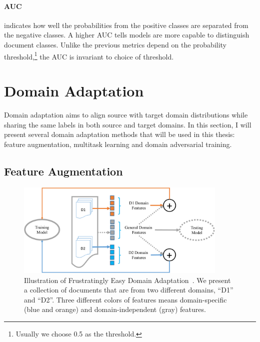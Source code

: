 \paragraph{AUC} indicates how well the probabilities from the positive classes are separated from the negative classes. 
A higher AUC tells models are more capable to distinguish document classes.
Unlike the previous metrics depend on the probability threshold,\footnote{Usually we choose 0.5 as the threshold.} the AUC is invariant to choice of threshold.


\section{Domain Adaptation}
\label{chap2:sec:domain_adpt}
Domain adaptation aims to align source with target domain distributions while sharing the same labels in both source and target domains.
In this section, I will present several domain adaptation methods that will be used in this thesis: feature augmentation, multitask learning and domain adversarial training.


\subsection{Feature Augmentation}
\label{chap2:subsec:feaaug}

\begin{figure}[tb!]
\centering
\includegraphics[width=0.90\textwidth]{images/chapter2/feature-aug.pdf}
\caption{Illustration of Frustratingly Easy Domain Adaptation~\cite{daume2007frustratingly}. We present a collection of documents that are from two different domains, ``D1'' and ``D2''. Three different colors of features means domain-specific (blue and orange) and domain-independent (gray) features. }
\label{chap2:fig:aug}
\end{figure}

